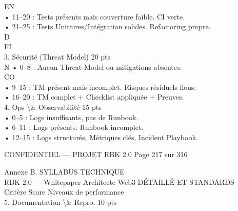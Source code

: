 \documentclass[12pt,landscape,a4paper]{article}
\newenvironment{confidential}
{\begin{tcolorbox}[
    colback=rbkred!5!white,
    colframe=rbkred!75!black,
    title=CONFIDENTIEL,
    fonttitle=\bfseries\color{white},
    coltitle=rbkred!75!black,
    breakable,
    enhanced,
    frame hidden,
    borderline west={2pt}{0pt}{rbkred!75!black}
]}
{\end{tcolorbox}}
\begin{document}
\vspace{0.5em}
\vspace{0.5em}
\vspace{0.5em}
\vspace{0.5em}
EN\\
• 11–20 : Tests présents mais couverture faible. CI verte.\\
• 21–25 : Tests Unitaires/Intégration solides. Refactoring propre.\\
\vspace{0.5em}
\vspace{0.5em}
\vspace{0.5em}
\vspace{0.5em}
D\\
FI\\
3. Sécurité (Threat Model)        20 pts\\
\vspace{0.5em}
N      • 0–8 : Aucun Threat Model ou mitigations absentes.\\
CO\\
• 9–15 : TM présent mais incomplet. Risques résiduels flous.\\
• 16–20 : TM complet + Checklist appliquée + Preuves.\\
\vspace{0.5em}
4. Ops \textbackslash{}& Observabilité            15 pts\\
• 0–5 : Logs insuffisants, pas de Runbook.\\
• 6–11 : Logs présents. Runbook incomplet.\\
• 12–15 : Logs structurés, Métriques clés, Incident Playbook.\\
\vspace{0.5em}
\vspace{0.5em}
\vspace{0.5em}
\vspace{0.5em}
\begin{confidential}CONFIDENTIEL — PROJET RBK 2.0                             Page 217 sur 316\end{confidential}
Annexe B. SYLLABUS TECHNIQUE\\
RBK 2.0 — Whitepaper Architecte Web3                                                                          DÉTAILLÉ ET STANDARDS\\
\vspace{0.5em}
\vspace{0.5em}
Critère                   Score                      Niveaux de performance\\
5. Documentation \textbackslash{}& Repro. 10 pts\\
\end{document}

